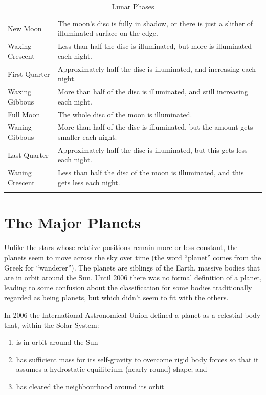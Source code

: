 \begin{longtabu} to \textwidth {l|X}
\toprule
New Moon&The moon's disc is fully in shadow, or there is just a slither of illuminated surface on the edge.\\
Waxing Crescent& Less than half the disc is illuminated, but more is illuminated each night.\\
First Quarter& Approximately half the disc is illuminated, and increasing each night.\\
Waxing Gibbous& More than half of the disc is illuminated, and still increasing each night.\\
Full Moon& The whole disc of the moon is illuminated.\\
Waning Gibbous& More than half of the disc is illuminated, but the amount gets smaller each night.\\
Last Quarter & Approximately half the disc is illuminated, but this gets less each night.\\
Waning Crescent& Less than half the disc of the moon is illuminated, and this gets less each night.\\
\bottomrule
\caption{Lunar Phases}
\label{tab:moonphases}
\end{longtabu}

\newpage
\section{The Major Planets}
\label{sec:Planets}

Unlike the stars whose relative positions remain more or less constant,
the planets seem to move across the sky over time (the word ``planet''
comes from the Greek for ``wanderer''). The planets are siblings of the Earth,
massive bodies that are in orbit around the Sun. Until 2006 there was no
formal definition of a planet, leading to some confusion about the
classification for some bodies traditionally regarded as being planets, but
which didn't seem to fit with the others.

In 2006 the International Astronomical Union defined a planet as a
celestial body that, within the Solar System:

\begin{enumerate}
\item
  is in orbit around the Sun
\item
  has sufficient mass for its self-gravity to overcome rigid body forces
  so that it assumes a hydrostatic equilibrium (nearly round) shape; and
\item
  has cleared the neighbourhood around its orbit
\end{enumerate}

